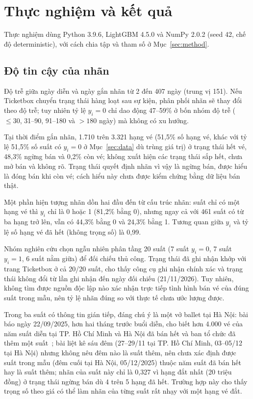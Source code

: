 \documentclass{IEEEtran}
\begin{document}
\section{Thực nghiệm và kết quả}
\label{sec:exp}
Thực nghiệm dùng Python 3.9.6, LightGBM 4.5.0 và NumPy 2.0.2 (seed 42, chế độ deterministic), với cách chia tập và tham số ở Mục~\ref{sec:method}.

\subsection{Độ tin cậy của nhãn}
Độ trễ giữa ngày diễn và ngày gắn nhãn từ 2 đến 407 ngày (trung vị 151). Nếu Ticketbox chuyển trạng thái hàng loạt sau sự kiện, phân phối nhãn sẽ thay đổi theo độ trễ; tuy nhiên tỷ lệ $y_i = 0$ chỉ dao động 47--59\% ở bốn nhóm độ trễ ($\leq 30$, 31--90, 91--180 và $> 180$ ngày) mà không có xu hướng.

Tại thời điểm gắn nhãn, 1.710 trên 3.321 hạng vé (51,5\% số hạng vé, khác với tỷ lệ 51,5\% số suất có $y_i = 0$ ở Mục~\ref{sec:data} dù trùng giá trị) ở trạng thái hết vé, 48,3\% ngừng bán và 0,2\% còn vé; không xuất hiện các trạng thái sắp hết, chưa mở bán và không rõ. Trạng thái quyết định nhãn vì vậy là ngừng bán, được hiểu là đóng bán khi còn vé; cách hiểu này chưa được kiểm chứng bằng dữ liệu bán thật.

Một phần hiện tượng nhãn dồn hai đầu đến từ cấu trúc nhãn: suất chỉ có một hạng vé thì $y_i$ chỉ là 0 hoặc 1 (81,2\% bằng 0), nhưng ngay cả với 461 suất có từ ba hạng trở lên, vẫn có 44,3\% bằng 0 và 24,3\% bằng 1. Tương quan giữa $y_i$ và tỷ lệ số hạng vé đã hết (không trọng số) là 0,99.

Nhóm nghiên cứu chọn ngẫu nhiên phân tầng 20 suất (7 suất $y_i = 0$, 7 suất $y_i = 1$, 6 suất nằm giữa) để đối chiếu thủ công. Trạng thái đã ghi nhận khớp với trang Ticketbox ở cả 20/20 suất, cho thấy công cụ ghi nhận chính xác và trạng thái không đổi từ lần ghi nhận đến ngày đối chiếu (21/11/2026). Tuy nhiên, không tìm được nguồn độc lập nào xác nhận trực tiếp tình hình bán vé của đúng suất trong mẫu, nên tỷ lệ nhãn đúng so với thực tế chưa ước lượng được.

Trong ba suất có thông tin gián tiếp, đáng chú ý là một vở ballet tại Hà Nội: bài báo ngày 22/09/2025, hơn hai tháng trước buổi diễn, cho biết hơn 4.000 vé của năm suất diễn tại TP. Hồ Chí Minh và Hà Nội đã bán hết và ban tổ chức đã thêm một suất~\cite{vnnballet}; bài liệt kê sáu đêm (27--29/11 tại TP. Hồ Chí Minh, 03--05/12 tại Hà Nội) nhưng không nêu đêm nào là suất thêm, nên chưa xác định được suất trong mẫu (đêm cuối tại Hà Nội, 05/12/2025) thuộc năm suất đã bán hết hay là suất thêm; nhãn của suất này chỉ là 0,327 vì hạng đắt nhất (20 triệu đồng) ở trạng thái ngừng bán dù 4 trên 5 hạng đã hết. Trường hợp này cho thấy trọng số theo giá có thể làm nhãn của từng suất rất nhạy với một hạng vé đắt.
\end{document}
